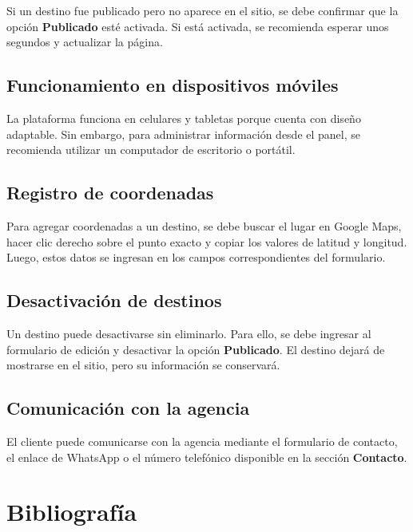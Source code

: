 \documentclass[12pt,letterpaper]{article}
\begin{document}
Si un destino fue publicado pero no aparece en el sitio, se debe confirmar que la opción \textbf{Publicado} esté activada. Si está activada, se recomienda esperar unos segundos y actualizar la página.

\subsection*{Funcionamiento en dispositivos móviles}

La plataforma funciona en celulares y tabletas porque cuenta con diseño adaptable. Sin embargo, para administrar información desde el panel, se recomienda utilizar un computador de escritorio o portátil.

\subsection*{Registro de coordenadas}

Para agregar coordenadas a un destino, se debe buscar el lugar en Google Maps, hacer clic derecho sobre el punto exacto y copiar los valores de latitud y longitud. Luego, estos datos se ingresan en los campos correspondientes del formulario.

\subsection*{Desactivación de destinos}

Un destino puede desactivarse sin eliminarlo. Para ello, se debe ingresar al formulario de edición y desactivar la opción \textbf{Publicado}. El destino dejará de mostrarse en el sitio, pero su información se conservará.

\subsection*{Comunicación con la agencia}

El cliente puede comunicarse con la agencia mediante el formulario de contacto, el enlace de WhatsApp o el número telefónico disponible en la sección \textbf{Contacto}.

\section{Bibliografía}
\end{document}
